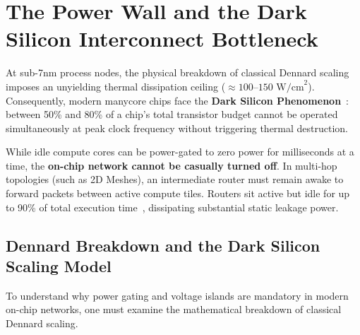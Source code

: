 \section{The Power Wall and the Dark Silicon Interconnect Bottleneck}
\label{sec:ch6_dark_silicon}

At sub-7nm process nodes, the physical breakdown of classical Dennard scaling imposes an unyielding thermal dissipation ceiling ($\approx 100$--$150\text{ W/cm}^2$). Consequently, modern manycore chips face the \textbf{Dark Silicon Phenomenon}~\cite{Esmaeilzadeh2011,Taylor2012}: between 50\% and 80\% of a chip's total transistor budget cannot be operated simultaneously at peak clock frequency without triggering thermal destruction.

While idle compute cores can be power-gated to zero power for milliseconds at a time, the \textbf{on-chip network cannot be casually turned off}. In multi-hop topologies (such as 2D Meshes), an intermediate router must remain awake to forward packets between active compute tiles. Routers sit active but idle for up to 90\% of total execution time~\cite{Matsutani2011}, dissipating substantial static leakage power.

\subsection{Dennard Breakdown and the Dark Silicon Scaling Model}
\label{subsec:ch6_dennard}

To understand why power gating and voltage islands are mandatory in modern on-chip networks, one must examine the mathematical breakdown of classical Dennard scaling.

